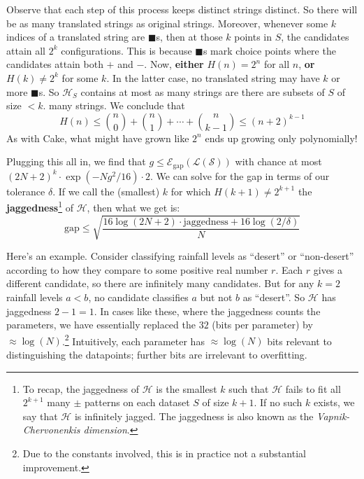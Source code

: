 \documentclass[openany, notitlepage, justified]{tufte-book}
\newcommand{\Ee}{\mathcal{E}}
\newcommand{\Hh}{\mathcal{H}}
\newcommand{\Ll}{\mathcal{L}}
\newcommand{\Ss}{\mathcal{S}}
\begin{document}
            Observe that each step of this process keeps distinct strings
            distinct.  So there will be as many translated strings as
            original strings.
            Moreover, whenever some $k$ indices of a translated string are
            $\blacksquare$s, then at those $k$ points in $S$, the
            candidates attain all $2^k$ configurations.  This is
            because $\blacksquare$s mark choice points where the candidates
            attain both $+$ and $-$.
            Now, \textbf{either} $H(n)=2^n$ for all $n$,
            \textbf{or} $H(k) \neq 2^k$ for some $k$.  In the latter 
            case, no translated string may have $k$ or more
            $\blacksquare$s.  So $\Hh_S$ contains at most
            as many strings are there are subsets of $S$ of size $<k$.
            many strings.  We conclude that
            $$
                H(n)
                \leq 
                {n\choose 0} + {n\choose 1} + \cdots + {n\choose k-1}
                \leq 
                (n+2)^{k-1}
            $$
            As with Cake, what might have grown like $2^n$
            ends up growing only polynomially!

            Plugging this all in, we find that
            $
               g \leq \Ee_{\text{gap}}(\Ll(\Ss))
            $ with chance at most
            $
               (2N+2)^k \cdot \exp(-Ng^2/16) \cdot 2
            $.
            We can solve for the gap in terms of our tolerance $\delta$.
            If we call the (smallest) $k$ for which $H(k+1) \neq 2^{k+1}$
            the \textbf{jaggedness}\footnote{
                To recap, the jaggedness of $\Hh$ is the smallest $k$ such
                that $\Hh$ fails to fit all $2^{k+1}$ many $\pm$ patterns
                on each dataset $S$ of size $k+1$.
                If no such $k$ exists, we say that $\Hh$ is infinitely jagged.
                The jaggedness is also known as the \emph{Vapnik-Chervonenkis
                dimension}.
            } of $\Hh$, then what we get is:
            $$
                \text{gap}
                \leq
                \sqrt{\frac{16\log(2N+2) \cdot \text{jaggedness} + 16\log(2/\delta)}{N}}
            $$

            Here's an example.  Consider classifying rainfall levels as
            ``desert'' or ``non-desert'' according to how they compare to
            some positive real number $r$.  Each $r$ gives a different
            candidate, so there are infinitely many candidates.  But for any
            $k=2$ rainfall levels $a<b$, no candidate classifies $a$ but not
            $b$ as ``desert''.  So $\Hh$ has jaggedness $2-1=1$.
            In cases like these, where the jaggedness counts the parameters, we
            have essentially replaced the $32$ (bits per parameter) by $\approx
            \log(N)$.\footnote{
                Due to the constants involved, this is in practice not a
                substantial improvement.
            } Intuitively, each parameter has $\approx \log(N)$ bits
            relevant to distinguishing the datapoints; further bits are
            irrelevant to overfitting.
\end{document}
